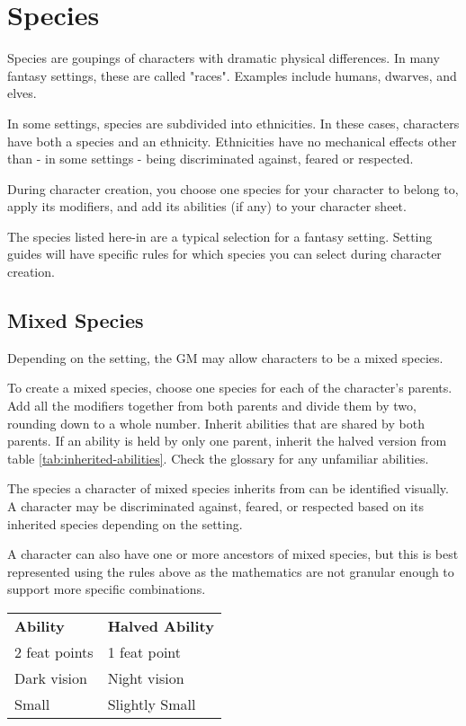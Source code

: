 \chapter{Species}\label{species}

\begin{multicols*}{2}
    Species are goupings of characters with dramatic physical differences. In many
    fantasy settings, these are called "races". Examples include humans, dwarves,
    and elves.

    In some settings, species are subdivided into ethnicities. In these cases,
    characters have both a species and an ethnicity. Ethnicities have no mechanical
    effects other than - in some settings - being discriminated against, feared or
    respected.

    During character creation, you choose one species for your character to belong
    to, apply its modifiers, and add its abilities (if any) to your character
    sheet.

    The species listed here-in are a typical selection for a fantasy setting.
    Setting guides will have specific rules for which species you can select
    during character creation.

    \section{Mixed Species}

    Depending on the setting, the GM may allow characters to be a mixed species.

    To create a mixed species, choose one species for each of the character's
    parents. Add all the modifiers together from both parents and divide them
    by two, rounding down to a whole number. Inherit abilities that are shared by
    both parents. If an ability is held by only one parent, inherit the halved
    version from table \ref{tab:inherited-abilities}. Check the glossary for
    any unfamiliar abilities.

    The species a character of mixed species inherits from can be identified
    visually. A character may be discriminated against, feared, or respected based
    on its inherited species depending on the setting.

    A character can also have one or more ancestors of mixed species, but this is
    best represented using the rules above as the mathematics are not granular
    enough to support more specific combinations.
    {
        \unclassedrowcolors
        \begin{tabularx}{0.5\textwidth}{l X}
            \textbf{Ability} & \textbf{Halved Ability} \\
            2 feat points & 1 feat point \\
            Dark vision & Night vision \\
            Small & Slightly Small \\
        \end{tabularx}
        \label{tab:inherited-abilities}
    }


\end{multicols*}
